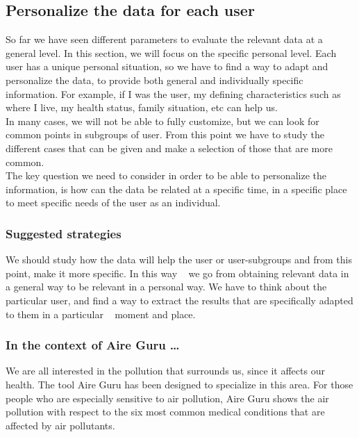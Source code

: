 \subsection{Personalize the data for each user}

So far we have seen different parameters to evaluate the relevant data at a general level. In this section, we will focus on the specific personal level.
Each user has a unique personal situation, so we have to find a way to adapt and personalize the data, to provide both general and individually specific information.
For example, if I was the user, my defining characteristics such as where I live,
my health status, family situation, etc can help us.\\

In many cases, we will not be able to fully customize, but we can look for common points in subgroups of
user. From this point we have to study the different cases that can be given and make a selection of those that are
more common.\\

The key question we need to consider in order to be able to personalize the information, is how can the data be related at a specific time, in a specific place to meet specific needs of the
user as an individual.

\subsubsection*{Suggested strategies} 

We should study how the data will help the user or user-subgroups and from this point, make it more specific. In this way
  we go from obtaining relevant data in a general way to be relevant in a personal way. We have to think about the
  particular user, and find a way to extract the results that are specifically adapted to them in a particular
  moment and place.

\subsubsection*{In the context of Aire Guru \ldots}

 We are all interested in the pollution that surrounds us, since it affects our health. The tool
 Aire Guru has been designed to specialize in this area. For those people who are especially sensitive to air pollution, Aire Guru shows the air pollution with respect to the six most common medical conditions that
 are affected by air pollutants.
 

